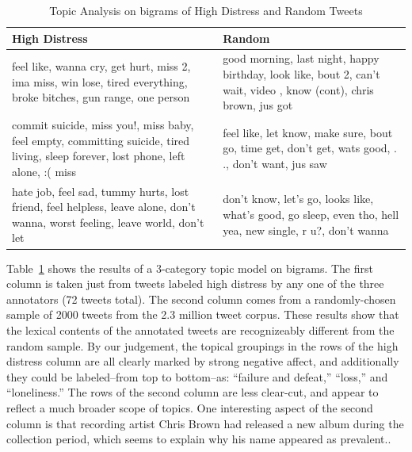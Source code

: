 \documentclass[11pt]{article}
\begin{document}
\begin{table}[h]
\footnotesize
\centering
\begin{tabular}{|>{\centering\arraybackslash}m{1.4in}| >{\centering\arraybackslash}m{1.2in}|}
\hline
High Distress & Random \\ \hline
feel like, wanna cry, get hurt, miss 2, ima miss, win lose, tired everything, broke bitches, gun range, one person & good morning, last night, happy birthday, look like, bout 2, can't wait, video , know (cont), chris brown, jus got \\ \hline
commit suicide, miss you!, miss baby, feel empty, committing suicide, tired living, sleep forever, lost phone, left alone, :( miss & feel like, let know, make sure, bout go, time get, don't get, wats good, . ., don't want, jus saw \\ \hline
hate job, feel sad, tummy hurts, lost friend, feel helpless, leave alone, don't wanna, worst feeling, leave world, don't let & don't know, let's go, looks like, what's good, go sleep, even tho, hell yea, new single, r u?, don't wanna \\ \hline
\end{tabular}
\caption{Topic Analysis on bigrams of High Distress and Random Tweets }
\label{tab:tm}
\end{table}

Table~\ref{tab:tm} shows the results of a 3-category topic model on bigrams.  The first column is taken just from tweets labeled high distress by any one of the three annotators (72 tweets total). The second column comes from a randomly-chosen sample of 2000 tweets from the 2.3 million tweet corpus. These results show that the lexical contents of the annotated tweets are recognizeably different from the random sample. By our judgement, the topical groupings in the rows of the high distress column are all clearly marked by strong negative affect, and additionally they could be labeled--from top to bottom--as: ``failure and defeat,'' ``loss,'' and ``loneliness.''  The rows of the second column are less clear-cut, and appear to reflect a much broader scope of topics. One interesting aspect of the second column is that recording artist Chris Brown had released a new album during the collection period, which seems to explain why his name appeared as prevalent..
\end{document}
